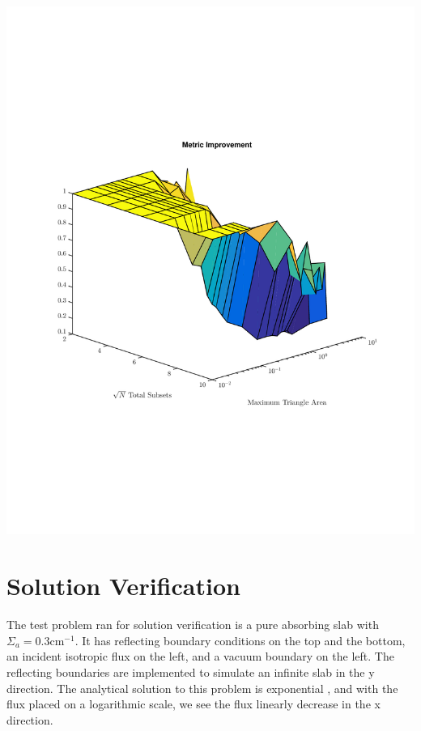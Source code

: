 \noindent\begin{minipage}{\textwidth}
\centering
\includegraphics[scale=0.80, trim = 0cm 3cm 0cm 3cm,clip]{figures/SameDiff.pdf}
\label{samediff}
\end{minipage}


\section{Solution Verification}

The test problem ran for solution verification is a pure absorbing slab with $\Sigma_a = 0.3 \text{cm}^{-1}$. It has reflecting boundary conditions on the top and the bottom, an incident isotropic flux on the left, and a vacuum boundary on the left. The reflecting boundaries are implemented to simulate an infinite slab in the y direction. The analytical solution to this problem is exponential , and with the flux placed on a logarithmic scale, we see the flux linearly decrease in the x direction. 

